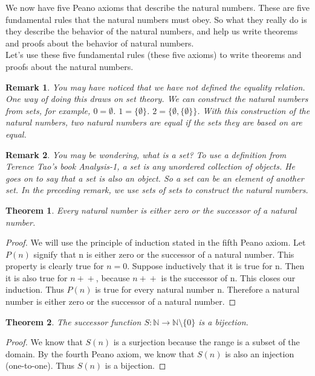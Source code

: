 \documentclass{article}
\newtheorem{theorem}{Theorem}
\newtheorem{remark}{Remark}
\newcommand{\inc}[1]{\mathrel{{{#1}+}+}}
\begin{document}
We now have five Peano axioms that describe the natural numbers. These are five fundamental rules that the natural numbers must obey. So what they really do is they describe the behavior of the natural numbers, and help us write theorems and proofs about the behavior of natural numbers. \\

Let's use these five fundamental rules (these five axioms) to write theorems and proofs about the natural numbers. 

\begin{remark}
You may have noticed that we have not defined the equality relation. One way of doing this draws on set theory. We can construct the natural numbers from sets, for example, $0 = \emptyset$. $1 = \{\emptyset\}$. $2 = \{\emptyset, \{\emptyset\}\}$. With this construction of the natural numbers, two natural numbers are equal if the sets they are based on are equal. 
\end{remark}

\begin{remark}
You may be wondering, what is a set? To use a definition from Terence Tao's book Analysis-1, a set is any unordered collection of objects. He goes on to say that a set is also an object. So a set can be an element of another set. In the preceding remark, we use sets of sets to construct the natural numbers.
\end{remark}

\begin{theorem}
Every natural number is either zero or the successor of a natural number.
\end{theorem}

\begin{proof}
We will use the principle of induction stated in the fifth Peano axiom. Let $P(n)$ signify that n is either zero or the successor of a natural number. This property is clearly true for $n = 0$. Suppose inductively that it is true for n. Then it is also true for $\inc{n}$, because $\inc{n}$ is the successor of n. This closes our induction. Thus $P(n)$ is true for every natural number n. Therefore a natural number is either zero or the successor of a natural number.
\end{proof}

\begin{theorem}
The successor function $S : \mathbb{N} \to \mathbb{N}\setminus\{0\}$ is a bijection.
\end{theorem}

\begin{proof}
We know that $S(n)$ is a surjection because the range is a subset of the domain. By the fourth Peano axiom, we know that $S(n)$ is also an injection (one-to-one). Thus $S(n)$ is a bijection.
\end{proof}
\end{document}
